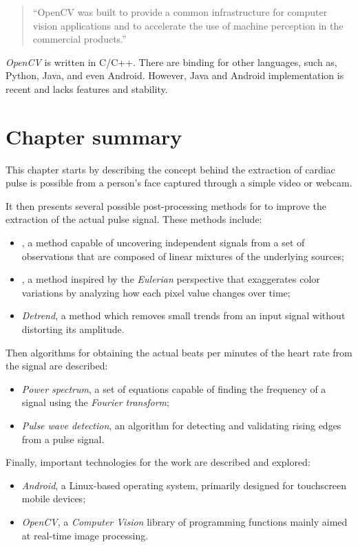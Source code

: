\begin{quote}
  ``OpenCV was built to provide a common infrastructure for computer
  vision applications and to accelerate the use of machine perception
  in the commercial products.''~\cite{Opencv2013About}
\end{quote}

\emph{OpenCV} is written in C/C++. There are binding for other languages,
such as, Python, Java, and even Android. However, Java and Android
implementation is recent and lacks features and stability.

\section{Chapter summary}

This chapter starts by describing the concept behind the extraction of
cardiac pulse is possible from a person's face captured through a simple video
or webcam.

It then presents several possible post-processing methods for to improve
the extraction of the actual pulse signal. These methods include:
\begin{itemize}
  \item \emph{\ica}, a method capable of uncovering independent signals from a set
        of observations that are composed of linear mixtures of the
        underlying sources;
  \item \emph{\evm}, a method inspired by the \emph{Eulerian} perspective that
        exaggerates color variations by analyzing how each pixel value
        changes over time;
  \item \emph{Detrend}, a method which removes small trends from an input signal
        without distorting its amplitude.
\end{itemize}

Then algorithms for obtaining the actual beats per minutes of the heart rate
from the signal are described:
\begin{itemize}
  \item \emph{Power spectrum}, a set of equations capable of finding the frequency of
        a signal using the \emph{Fourier transform};
  \item \emph{Pulse wave detection}, an algorithm for detecting and validating
        rising edges from a pulse signal.
\end{itemize}

Finally, important technologies for the work are described and explored:
\begin{itemize}
  \item \emph{Android}, a Linux-based operating system, primarily designed for
        touchscreen mobile devices;
  \item \emph{OpenCV}, a \emph{Computer Vision} library of programming functions
        mainly aimed at real-time image processing.
\end{itemize}

